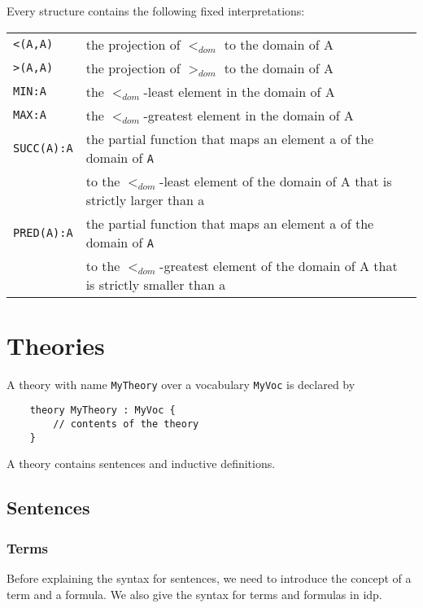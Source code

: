 \documentclass[a4]{article}
\newcommand{\idp}{{\sc idp}\xspace}
\newcommand{\code}[1]{{\tt #1}}
\begin{document}
Every structure contains the following fixed interpretations:

\begin{center}
	
\begin{tabular}{l|l}
\code{<(A,A)} & the projection of $<_{dom}$ to the domain of A \\
\code{>(A,A)} & the projection of $>_{dom}$ to the domain of A \\
\code{MIN:A} & the $<_{dom}$-least element in the domain of A \\
\code{MAX:A} & the $<_{dom}$-greatest element in the domain of A \\
\code{SUCC(A):A} & the partial function that maps an element a  of the domain of \code{A} \\ & to the $<_{dom}$-least element of the domain of A that is strictly larger than a \\
\code{PRED(A):A} & the partial function that maps an element a  of the domain of \code{A} \\ & to the $<_{dom}$-greatest element of the domain of A that is strictly smaller than a \\
\end{tabular} 

\end{center}


\section{Theories}

A theory with name \code{MyTheory} over a vocabulary \code{MyVoc} is declared by
\begin{lstlisting}
	theory MyTheory : MyVoc {
		// contents of the theory
	}
\end{lstlisting}
A theory contains sentences and inductive definitions.

\subsection{Sentences}


\subsubsection{Terms}

Before explaining the syntax for sentences, we need to introduce the concept of a term and a formula. We also give the syntax for terms and formulas in \idp.\\
\end{document}
